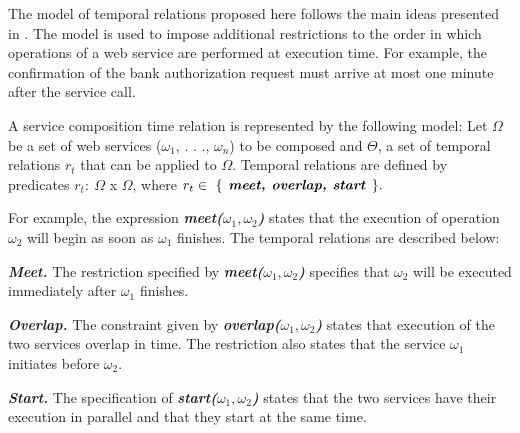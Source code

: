 The model of temporal relations proposed here follows the main ideas presented in
\cite{Allen:1983, BeVaC00}. The model is used to impose additional restrictions
to the order in which operations of a web service are performed at execution time. For example, the
confirmation of the bank authorization request must arrive at most one minute after the service call.
 
A service composition time relation is represented by the following
model: Let   $\Omega$ be a set of web services ($\omega_1$, . . .,
$\omega_n$) to be composed and $\Theta$, a set of temporal relations $r_t$ that can be applied to $\Omega$. 
Temporal relations are defined by predicates $r_t:\ \Omega$ x $\Omega$, where
$r_t \in~\{\textbf{\textit{ %
meet, overlap, start
}}\}. $

For example, the  
expression \textbf{\textit{meet($\omega_1, \omega_2$)}}
states that the execution of operation $\omega_2$ will begin as soon as $\omega_1$ finishes.
The temporal relations are described below:



\begin{trivlist}

\item{\bf\em Meet.}
The restriction specified by \textbf{\textit{meet($\omega_1, \omega_2$)}} specifies that $\omega_2$ will be executed immediately after $\omega_1$ finishes.

\item{\bf\em Overlap.}
The constraint given by \textbf{\textit{overlap($\omega_1, \omega_2$)}}
states that execution of the two services overlap in time. 
The restriction also states that the service $\omega_1$ initiates before $\omega_2$.
  
\item{\bf\em Start.}
The specification of \textbf{\textit{start($\omega_1, \omega_2$)}}
states that the two services have their execution in parallel and that they start at the same time. 

\end{trivlist} 
  
